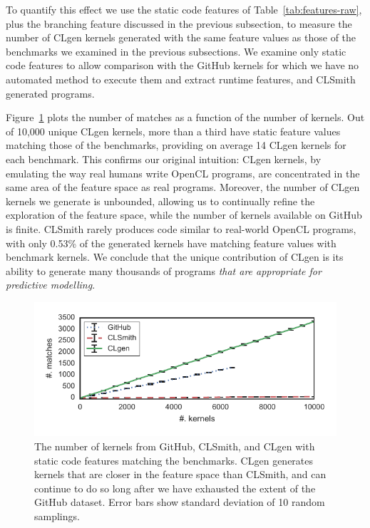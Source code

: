 To quantify this effect we use the static code features of Table~\ref{tab:features-raw}, plus the branching feature discussed in the previous subsection, to measure the number of CLgen kernels generated with the same feature values as those of the benchmarks we examined in the previous subsections. We examine only static code features to allow comparison with the GitHub kernels for which we have no automated method to execute them and extract runtime features, and CLSmith generated programs.

Figure~\ref{fig:nn} plots the number of matches as a function of the number of kernels. Out of 10,000 unique CLgen kernels, more than a third have static feature values matching those of the benchmarks, providing on average 14 CLgen kernels for each benchmark. This confirms our original intuition: CLgen kernels, by emulating the way real humans write OpenCL programs, are concentrated in the same area of the feature space as real programs. Moreover, the number of CLgen kernels we generate is unbounded, allowing us to continually refine the exploration of the feature space, while the number of kernels available on GitHub is finite. CLSmith rarely produces code similar to real-world OpenCL programs, with only 0.53\% of the generated kernels have matching feature values with benchmark kernels. We conclude that the unique contribution of CLgen is its ability to generate many thousands of programs \textit{that are appropriate for predictive modelling}.

\begin{figure}
  \includegraphics[width=\columnwidth]{img/closeness} %
  \caption{The number of kernels from GitHub, CLSmith, and CLgen with static code features matching the benchmarks. CLgen generates kernels that are closer in the feature space than CLSmith, and can continue to do so long after we have exhausted the extent of the GitHub dataset. Error bars show standard deviation of 10 random samplings.}%
  \label{fig:nn}
\end{figure}
